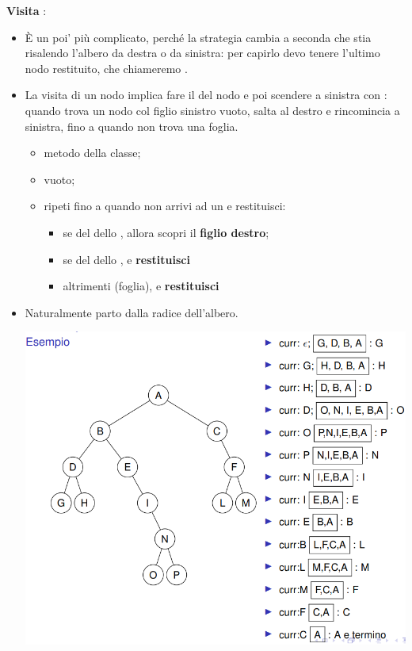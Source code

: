 \textbf{Visita} \textbf{\textcolor{blue}{}}:
\begin{itemize}
    \item È un poi’ più complicato, perché la strategia cambia a
    seconda che stia risalendo l’albero da destra o da sinistra:
    per capirlo devo tenere l’ultimo nodo restituito, che
    chiameremo .
    \item La visita di un nodo implica fare il  del nodo e poi
    scendere a sinistra con : quando
    trova un nodo col figlio sinistro vuoto, salta al destro e
    rincomincia a sinistra, fino a quando non trova una foglia.
    \begin{itemize}
    \item \textbf{\textcolor{blue}{}} metodo della classe;
    \item \textbf{\textcolor{blue}{}}  vuoto;
    \item \textbf{\textcolor{blue}{}} ripeti fino a quando non arrivi ad un  e
    restituisci:
        \begin{itemize}
            \item se  del  dello , allora
            scopri il \textbf{figlio destro};
            \item se  del  dello ,  e
            \textbf{restituisci}
            \item altrimenti (foglia),  e \textbf{restituisci}
        \end{itemize}
    \end{itemize}
    \item Naturalmente parto dalla radice dell’albero.
    \begin{center}
        \includegraphics[scale = 0.5]{Capitoli/Iteratori/Esempi/Visita PostOrder.png}
    \end{center}
\end{itemize}
